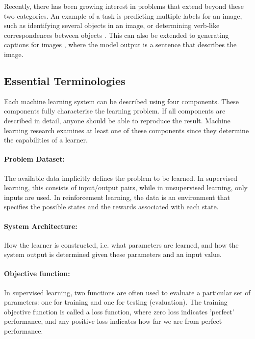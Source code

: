 \noindent Recently, there has been growing interest in problems that extend beyond these two categories. An example of a task is predicting multiple labels for an image, such as identifying several objects in an image, or determining verb-like correspondences between objects \cite{karpathy2015deep}. This can also be extended to generating captions for images \cite{xu2015show}, where the model output is a sentence that describes the image.

\subsection[Essential Terminologies]{Essential Terminologies}

Each machine learning system can be described using four components. These components fully characterise the learning problem. If all components are described in detail, anyone should be able to reproduce the result. Machine learning research examines at least one of these components since they determine the capabilities of a learner.

\paragraph{Problem Dataset:} The available data implicitly defines the problem to be learned. In supervised learning, this consists of input/output pairs, while in unsupervised learning, only inputs are used. In reinforcement learning, the data is an environment that specifies the possible states and the rewards associated with each state.

\paragraph{System Architecture:} How the learner is constructed, i.e. what parameters are learned, and how the system output is determined given these parameters and an input value.

\paragraph{Objective function:} In supervised learning, two functions are often used to evaluate a particular set of parameters: one for training and one for testing (evaluation). The training objective function is called a loss function, where zero loss indicates 'perfect' performance, and any positive loss indicates how far we are from perfect performance.

